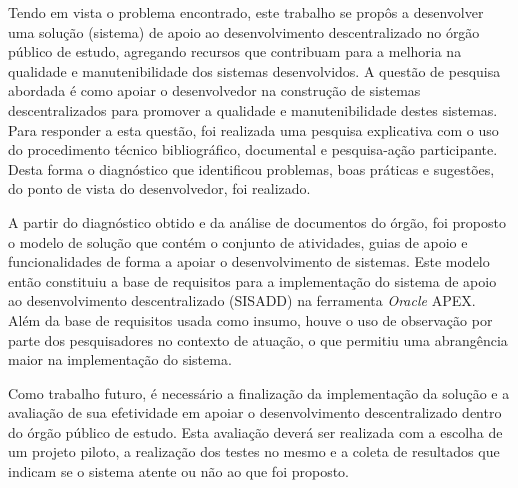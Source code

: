 Tendo em vista o problema encontrado, este trabalho se propôs a desenvolver uma solução (sistema) de apoio ao desenvolvimento descentralizado no órgão público de estudo, agregando recursos que contribuam para a melhoria na qualidade e manutenibilidade dos sistemas desenvolvidos. A questão de pesquisa abordada é como apoiar o desenvolvedor na construção de sistemas descentralizados para promover a qualidade e manutenibilidade destes sistemas. Para responder a esta questão, foi realizada uma pesquisa explicativa com o uso do procedimento técnico bibliográfico, documental e pesquisa-ação participante. Desta forma o diagnóstico que identificou problemas, boas práticas e sugestões, do ponto de vista do desenvolvedor, foi realizado.

A partir do diagnóstico obtido e da análise de documentos do órgão, foi proposto o modelo de solução que contém o conjunto de atividades, guias de apoio e funcionalidades de forma a apoiar o desenvolvimento de sistemas. Este modelo então constituiu a base de requisitos para a implementação do sistema de apoio ao desenvolvimento descentralizado (SISADD) na ferramenta \textit{Oracle} APEX. Além da base de requisitos usada como insumo, houve o uso de observação por parte dos pesquisadores no contexto de atuação, o que permitiu uma abrangência maior na implementação do sistema.

Como trabalho futuro, é necessário a finalização da implementação da solução e a avaliação de sua efetividade em apoiar o desenvolvimento descentralizado dentro do órgão público de estudo. Esta avaliação deverá ser realizada com a escolha de um projeto piloto, a realização dos testes no mesmo e a coleta de resultados que indicam se o sistema atente ou não ao que foi proposto.